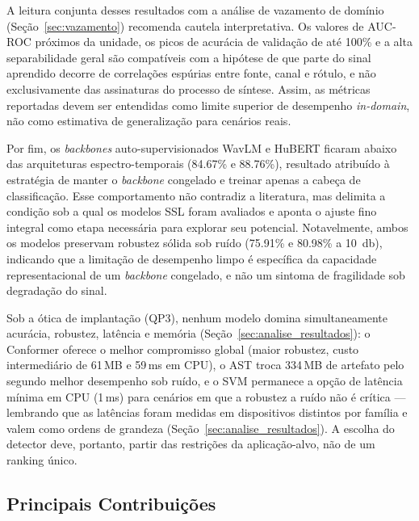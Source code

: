 \documentclass[12pt,a4paper]{article}
\begin{document}
A leitura conjunta desses resultados com a análise de vazamento de domínio
(Seção~\ref{sec:vazamento}) recomenda cautela interpretativa. Os valores de
AUC-ROC próximos da unidade, os picos de acurácia de validação de até
\num{100}\% e a alta separabilidade geral são compatíveis com a hipótese de que
parte do sinal aprendido decorre de correlações espúrias entre fonte, canal e
rótulo, e não exclusivamente das assinaturas do processo de síntese. Assim, as
métricas reportadas devem ser entendidas como limite superior de desempenho
\textit{in-domain}, não como estimativa de generalização para cenários reais.

Por fim, os \textit{backbones} auto-supervisionados WavLM e HuBERT ficaram
abaixo das arquiteturas espectro-temporais (\num{84,67}\% e \num{88,76}\%),
resultado atribuído à estratégia de manter o \textit{backbone} congelado e
treinar apenas a cabeça de classificação. Esse comportamento não contradiz a
literatura, mas delimita a condição sob a qual os modelos SSL foram avaliados e
aponta o ajuste fino integral como etapa necessária para explorar seu
potencial. Notavelmente, ambos os modelos preservam robustez sólida sob
ruído (\num{75,91}\% e \num{80,98}\% a \SI{10}{\decibel}), indicando que a
limitação de desempenho limpo é específica da capacidade representacional de
um \textit{backbone} congelado, e não um sintoma de fragilidade sob
degradação do sinal.

Sob a ótica de implantação (QP3), nenhum modelo domina simultaneamente
acurácia, robustez, latência e memória
(Seção~\ref{sec:analise_resultados}): o Conformer
oferece o melhor compromisso global (maior robustez, custo intermediário de
\num{61}\,MB e \num{59}\,ms em CPU), o AST troca \num{334}\,MB de artefato pelo
segundo melhor desempenho sob ruído, e o SVM permanece a opção de latência
mínima em CPU (\num{1}\,ms) para cenários em que a robustez a ruído não é
crítica --- lembrando que as latências foram medidas em dispositivos distintos
por família e valem como ordens de grandeza
(Seção~\ref{sec:analise_resultados}). A escolha do detector deve, portanto,
partir das restrições da aplicação-alvo, não de um ranking único.

\subsection{Principais Contribuições}
\end{document}
